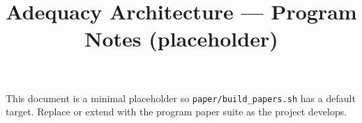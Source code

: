 \documentclass[11pt]{article}
\title{Adequacy Architecture --- Program Notes (placeholder)}
\author{}
\date{}
\begin{document}
\maketitle

This document is a minimal placeholder so \texttt{paper/build\_papers.sh} has a default target.
Replace or extend with the program paper suite as the project develops.
\end{document}
